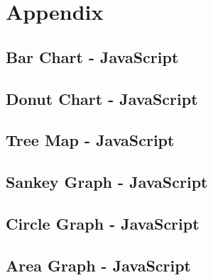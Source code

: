 \appendix
\chapter{Appendix}

\section{Bar Chart - JavaScript}


\section{Donut Chart - JavaScript}


\section{Tree Map - JavaScript}


\section{Sankey Graph - JavaScript}


\section{Circle Graph - JavaScript}


\section{Area Graph - JavaScript}
